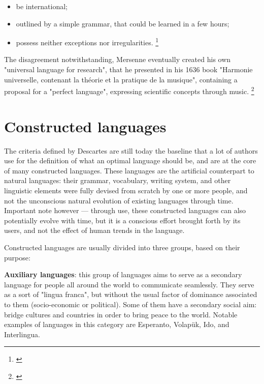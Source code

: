 \begin{itemize}
    \setlength\itemsep{-0.5em}
    \item be international;
    \item outlined by a simple grammar, that could be learned in a few hours;
    \item possess neither exceptions nor irregularities. \footnote{\cite[76-82]{descartes1897oeuvres}}
\end{itemize}

The disagreement notwithstanding, Mersenne eventually created his own "universal language for research", that he presented in his 1636 book
"Harmonie universelle, contenant la th{\'e}orie et la pratique de la musique", containing a proposal for a "perfect language", expressing scientific
concepts through music. \footnote{\cite[Book I, proposition 24]{mersenne1636}}

\section{Constructed languages}

The criteria defined by Descartes are still today the baseline that a lot of authors use for the definition of what an optimal language should be, and are at the core of many
constructed languages. These languages are the artificial counterpart to natural languages: their grammar, vocabulary, writing system, and other linguistic elements were fully
devised from scratch by one or more people, and not the unconscious natural evolution of existing languages through time. Important note however --- through use, these constructed
languages can also potentially evolve with time, but it is a conscious effort brought forth by its users, and not the effect of human trends in the language.\newline

Constructed languages are usually divided into three groups, based on their purpose:\newline

\newpage
\textbf{Auxiliary languages}: this group of languages aims to serve as a secondary language for people all around the world to communicate seamlessly.
They serve as a sort of "lingua franca", but without the usual factor of dominance associated to them (socio-economic or political). Some of them have a secondary social aim:
bridge cultures and countries in order to bring peace to the world. Notable examples of languages in this category are Esperanto, Volapük, Ido, and Interlingua.\newline

